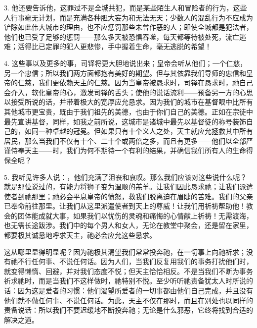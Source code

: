 3. 他还要告诉他，这罪过不是全城共犯，而是某些陌生人和冒险者的行为，这些人行事毫无计划，而是充满各种胆大妄为和无法无天；少数人的混乱行为不应成为铲除如此伟大城市的理由，也不应惩罚那些未曾作恶的人；即使全城都是犯法者，他们也已受了足够的惩罚——那么多天被恐惧吞噬，每天都等待被处死，流亡逃难；活得比已定罪的犯人更悲惨，手中握着生命，毫无逃脱的希望！\par

4. 这些事以及更多的事，司铎将更大胆地说出来；皇帝会听从他们；一个仁慈，另一个忠信；所以我们两方面都抱有美好的期望。但与其依靠我们导师的忠信和皇帝的仁慈，我们更依赖天主的仁慈。因为当皇帝被恳求时，司铎在恳求时，祂自己会介入，软化皇帝的心，激发司铎的舌头；使他的说话流利——预备另一方的心思以接受所说的话，并带着极大的宽厚应允恳求。因为我们的城市在基督眼中比所有其他城市更宝贵，既由于我们祖先的美德，也由于你们自己的美德。正如在宗徒中最先宣讲基督，同样，如我之前所说，这城市是诸城中最先以基督徒的称号装饰自己的，如同一种卓越的冠冕。但如果只有十个义人之处，天主就应允拯救其中所有居民，那么当我们不仅有十个、二十个或两倍之多，而且有更多——他们以全部严谨侍奉天主——时，我们为何不期待一个有利的结果，并确信我们所有人的生命得保全呢？\par

5. 我听见许多人说：，他们充满了沮丧和哀叹。那么我们应该对这些说什么呢？就是那位说过的，有能力将狮子变为温顺的羔羊。让我们因此恳求祂；让我们派遣使者到祂那里；祂必会平息皇帝的愤怒，救我们脱离迫在眉睫的苦难。我们的父亲已奉命前往那里。让我们从这里派遣使者到天上的尊威！让我们用祈祷帮助他！教会的团体能成就大事，如果我们以忧伤的灵魂和痛悔的心情献上祈祷！无需渡海，也无需长途跋涉。我们中的每个男人和女人，无论在教堂中聚会，还是留在家里，都要极其诚恳地呼求天主，祂必会应允这些恳求。\par

这从哪里显得明显呢？因为祂极其渴望我们常常投奔祂，在一切事上向祂祈求；没有祂不行任何事、不说任何话。因为人们，当我们反复用我们的事务打扰他们时，就变得懒惰、回避，并对我们态度不悦；但天主恰恰相反。不是当我们不断为事务祈求祂时，而是当我们不这样做时，祂特别不悦。至少听听祂责备犹太人时所说的话：因为这是爱者的习惯：他们渴望所爱者的一切事都由他们自己完成，并且没有他们就不做任何事、不说任何话。为此，天主不仅在那时，而且在别处也以同样的责备说话：所以我们不要迟缓地不断投奔祂；无论是什么邪恶，它终将找到合适的解决之道。\par

